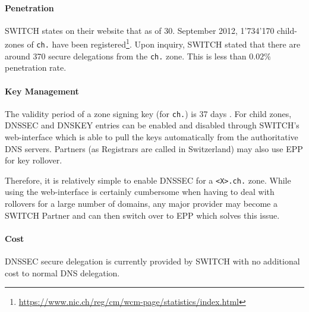 \documentclass[a4paper,twocolumn]{scrartcl}
\begin{document}
\paragraph{Penetration} SWITCH states on their website that as of
30. September 2012, 1'734'170 child-zones of \verb|ch.| have been
registered\footnote{\url{https://www.nic.ch/reg/cm/wcm-page/statistics/index.html}}. Upon
inquiry, SWITCH stated that there are around 370 secure delegations
from the \verb|ch.| zone. This is less than $0.02\%$ penetration
rate.

\paragraph{Key Management} The validity period of a zone signing key
(for \verb|ch.|) is 37 days \cite{switch10}. For child zones,  DNSSEC
and DNSKEY entries can be enabled and disabled through SWITCH's 
web-interface which is able to pull the keys automatically from the
authoritative DNS servers. Partners (as Registrars are called in
Switzerland) may also use EPP for key rollover.

Therefore, it is relatively simple to enable DNSSEC for a \verb|<X>.ch.| 
zone. While using the web-interface is certainly cumbersome when
having to deal with rollovers for a large number of domains, any major
provider may become a SWITCH Partner and can then switch over to EPP
which solves this issue.

\paragraph{Cost} DNSSEC secure delegation is currently provided by
SWITCH with no additional cost to normal DNS delegation.

\nocite{*}


\end{document}

